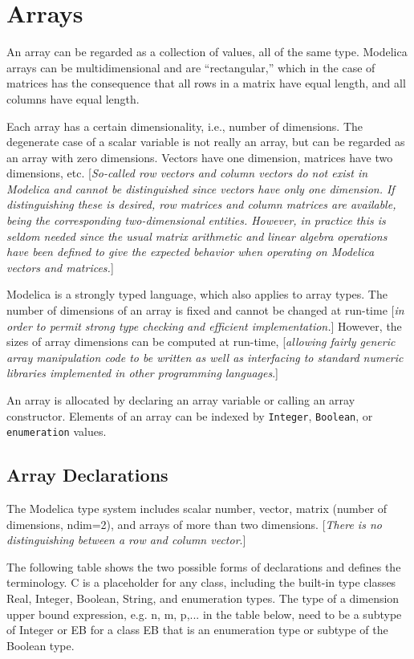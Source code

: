 \chapter{Arrays}

An array can be regarded as a collection of values, all of the same
type. Modelica arrays can be multidimensional and are ``rectangular,''
which in the case of matrices has the consequence that all rows in a
matrix have equal length, and all columns have equal length.

Each array has a certain dimensionality, i.e., number of dimensions. The
degenerate case of a scalar variable is not really an array, but can be
regarded as an array with zero dimensions. Vectors have one dimension,
matrices have two dimensions, etc. {[}\emph{So-called row vectors and
column vectors do not exist in Modelica and cannot be distinguished
since vectors have only one dimension. If distinguishing these is
desired, row matrices and column matrices are available, being the
corresponding two-dimensional entities. However, in practice this is
seldom needed since the usual matrix arithmetic and linear algebra
operations have been defined to give the expected behavior when
operating on Modelica vectors and matrices.}{]}

Modelica is a strongly typed language, which also applies to array
types. The number of dimensions of an array is fixed and cannot be
changed at run-time {[}\emph{in order to permit strong type checking and
efficient implementation.}{]} However, the sizes of array dimensions can
be computed at run-time, {[}\emph{allowing fairly generic array
manipulation code to be written as well as interfacing to standard
numeric libraries implemented in other programming languages}.{]}

An array is allocated by declaring an array variable or calling an array
constructor. Elements of an array can be indexed by \lstinline!Integer!, \lstinline!Boolean!, or
\lstinline!enumeration! values.

\section{Array Declarations}

The Modelica type system includes scalar number, vector, matrix (number
of dimensions, ndim=2), and arrays of more than two dimensions.
{[}\emph{There is no distinguishing between a row and column vector}.{]}

The following table shows the two possible forms of declarations and
defines the terminology. C is a placeholder for any class, including the
built-in type classes Real, Integer, Boolean, String, and enumeration
types. The type of a dimension upper bound expression, e.g. n, m, p,...
in the table below, need to be a subtype of Integer or EB for a class EB
that is an enumeration type or subtype of the Boolean type. 

